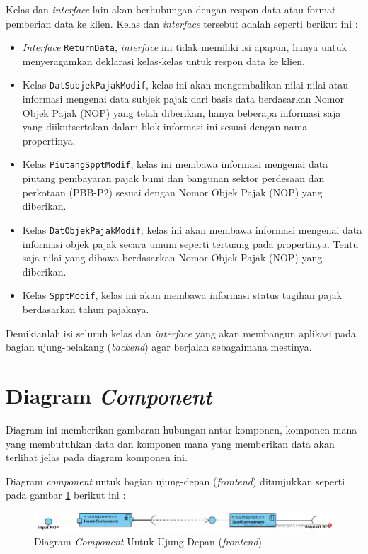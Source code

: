 Kelas dan \textit{interface} lain akan berhubungan dengan respon data atau format pemberian data ke klien. Kelas dan \textit{interface} tersebut adalah seperti berikut ini :

\begin{itemize}
	\item \textit{Interface} \texttt{ReturnData}, \textit{interface} ini tidak memiliki isi apapun, hanya untuk menyeragamkan deklarasi kelas-kelas untuk respon data ke klien.
	\item Kelas \texttt{DatSubjekPajakModif}, kelas ini akan mengembalikan nilai-nilai atau informasi mengenai data subjek pajak dari basis data berdasarkan Nomor Objek Pajak (NOP) yang telah diberikan, hanya beberapa informasi saja yang diikutsertakan dalam blok informasi ini sesuai dengan nama propertinya. 
	\item Kelas \texttt{PiutangSpptModif}, kelas ini membawa informasi mengenai data piutang pembayaran pajak bumi dan bangunan sektor perdesaan dan perkotaan (PBB-P2) sesuai dengan Nomor Objek Pajak (NOP) yang diberikan.
	\item Kelas \texttt{DatObjekPajakModif}, kelas ini akan membawa informasi mengenai data informasi objek pajak secara umum seperti tertuang pada propertinya. Tentu saja nilai yang dibawa berdasarkan Nomor Objek Pajak (NOP) yang diberikan.
	\item Kelas \texttt{SpptModif}, kelas ini akan membawa informasi status tagihan pajak berdasarkan tahun pajaknya.
\end{itemize}

Demikianlah isi seluruh kelas dan \textit{interface} yang akan membangun aplikasi pada bagian ujung-belakang (\textit{backend}) agar berjalan sebagaimana mestinya.

\section{Diagram \textit{Component}}

Diagram ini memberikan gambaran hubungan antar komponen, komponen mana yang membutuhkan data dan komponen mana yang memberikan data akan terlihat jelas pada diagram komponen ini.

Diagram \textit{component} untuk bagian ujung-depan (\textit{frontend}) ditunjukkan seperti pada gambar \ref{fig:comp-dia-fe} berikut ini :

\begin{figure}[H]
	\centering
	\includegraphics[width=1\textwidth]{./resources/uml/component-diagram-fe}
	\caption{Diagram \textit{Component} Untuk Ujung-Depan (\textit{frontend})}
	\label{fig:comp-dia-fe}
\end{figure}

